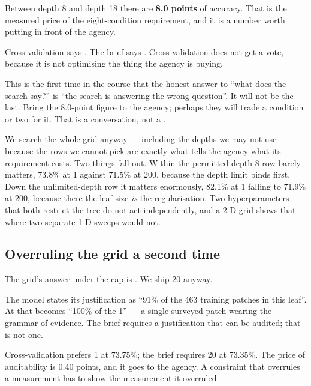 \documentclass[11pt,a4paper]{article}
\begin{document}
Between depth 8 and depth 18 there are \textbf{8.0 points} of accuracy. That is
the measured price of the eight-condition requirement, and it is a number worth
putting in front of the agency.

\begin{failbox}[title={Failure condition --- the one hyperparameter we may not tune}]
Cross-validation says . The brief says
. Cross-validation does not get a vote, because it is not
optimising the thing the agency is buying.

This is the first time in the course that the honest answer to ``what does the
search say?'' is ``the search is answering the wrong question''. It will not be
the last. Bring the 8.0-point figure to the agency; perhaps they will trade a
condition or two for it. That is a conversation, not a .
\end{failbox}

We search the whole grid anyway --- including the depths we may not use ---
because the rows we cannot pick are exactly what tells the agency what its
requirement costs. Two things fall out. Within the permitted depth-8 row
 barely matters, 73.8\% at 1 against 71.5\% at 200,
because the depth limit binds first. Down the unlimited-depth row it matters
enormously, 82.1\% at 1 falling to 71.9\% at 200, because there the leaf size
\emph{is} the regularisation. Two hyperparameters that both restrict the tree
do not act independently, and a 2-D grid shows that where two separate 1-D
sweeps would not.

\subsection{Overruling the grid a second time}

The grid's answer under the cap is . We ship 20
anyway.

\begin{keybox}[title={Why}]
The model states its justification as ``91\% of the 463 training patches in
this leaf''. At  that becomes ``100\% of the 1'' ---
a single surveyed patch wearing the grammar of evidence. The brief requires a
justification that can be audited; that is not one.

Cross-validation prefers 1 at 73.75\%; the brief requires 20 at 73.35\%. The
price of auditability is 0.40 points, and it goes to the agency. A constraint
that overrules a measurement has to show the measurement it overruled.
\end{keybox}
\end{document}
